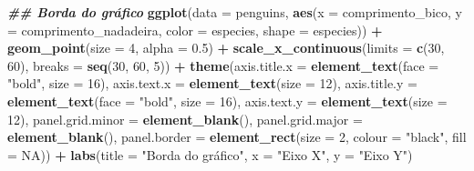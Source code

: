 \documentclass[
]{article}
\newenvironment{Shaded}{\begin{snugshade}}{\end{snugshade}}
\newcommand{\AttributeTok}[1]{\textcolor[rgb]{0.13,0.29,0.53}{#1}}
\newcommand{\ConstantTok}[1]{\textcolor[rgb]{0.56,0.35,0.01}{#1}}
\newcommand{\DecValTok}[1]{\textcolor[rgb]{0.00,0.00,0.81}{#1}}
\newcommand{\DocumentationTok}[1]{\textcolor[rgb]{0.56,0.35,0.01}{\textbf{\textit{#1}}}}
\newcommand{\FloatTok}[1]{\textcolor[rgb]{0.00,0.00,0.81}{#1}}
\newcommand{\FunctionTok}[1]{\textcolor[rgb]{0.13,0.29,0.53}{\textbf{#1}}}
\newcommand{\NormalTok}[1]{#1}
\newcommand{\SpecialCharTok}[1]{\textcolor[rgb]{0.81,0.36,0.00}{\textbf{#1}}}
\newcommand{\StringTok}[1]{\textcolor[rgb]{0.31,0.60,0.02}{#1}}
\begin{document}
\begin{Shaded}
\begin{Highlighting}[]
\DocumentationTok{\#\# Borda do gráfico}
\FunctionTok{ggplot}\NormalTok{(}\AttributeTok{data =}\NormalTok{ penguins, }
       \FunctionTok{aes}\NormalTok{(}\AttributeTok{x =}\NormalTok{ comprimento\_bico, }\AttributeTok{y =}\NormalTok{ comprimento\_nadadeira,}
           \AttributeTok{color =}\NormalTok{ especies, }\AttributeTok{shape =}\NormalTok{ especies)) }\SpecialCharTok{+}
    \FunctionTok{geom\_point}\NormalTok{(}\AttributeTok{size =} \DecValTok{4}\NormalTok{, }\AttributeTok{alpha =} \FloatTok{0.5}\NormalTok{) }\SpecialCharTok{+}
    \FunctionTok{scale\_x\_continuous}\NormalTok{(}\AttributeTok{limits =} \FunctionTok{c}\NormalTok{(}\DecValTok{30}\NormalTok{, }\DecValTok{60}\NormalTok{), }\AttributeTok{breaks =} \FunctionTok{seq}\NormalTok{(}\DecValTok{30}\NormalTok{, }\DecValTok{60}\NormalTok{, }\DecValTok{5}\NormalTok{)) }\SpecialCharTok{+}
    \FunctionTok{theme}\NormalTok{(}\AttributeTok{axis.title.x =} \FunctionTok{element\_text}\NormalTok{(}\AttributeTok{face =} \StringTok{"bold"}\NormalTok{, }\AttributeTok{size =} \DecValTok{16}\NormalTok{),}
          \AttributeTok{axis.text.x =} \FunctionTok{element\_text}\NormalTok{(}\AttributeTok{size =} \DecValTok{12}\NormalTok{),}
          \AttributeTok{axis.title.y =} \FunctionTok{element\_text}\NormalTok{(}\AttributeTok{face =} \StringTok{"bold"}\NormalTok{, }\AttributeTok{size =} \DecValTok{16}\NormalTok{),}
          \AttributeTok{axis.text.y =} \FunctionTok{element\_text}\NormalTok{(}\AttributeTok{size =} \DecValTok{12}\NormalTok{),}
          \AttributeTok{panel.grid.minor =} \FunctionTok{element\_blank}\NormalTok{(),}
          \AttributeTok{panel.grid.major =} \FunctionTok{element\_blank}\NormalTok{(),}
          \AttributeTok{panel.border =} \FunctionTok{element\_rect}\NormalTok{(}\AttributeTok{size =} \DecValTok{2}\NormalTok{, }\AttributeTok{colour =} \StringTok{"black"}\NormalTok{, }\AttributeTok{fill =} \ConstantTok{NA}\NormalTok{)) }\SpecialCharTok{+}
    \FunctionTok{labs}\NormalTok{(}\AttributeTok{title =} \StringTok{"Borda do gráfico"}\NormalTok{, }\AttributeTok{x =} \StringTok{"Eixo X"}\NormalTok{, }\AttributeTok{y =} \StringTok{"Eixo Y"}\NormalTok{)}
\end{Highlighting}
\end{Shaded}
\end{document}
